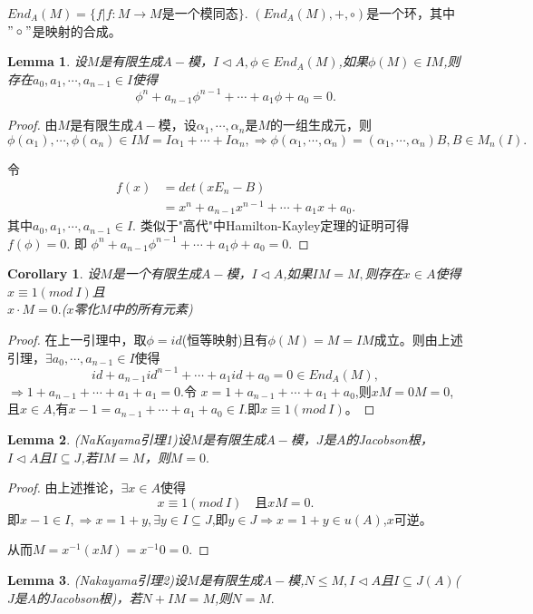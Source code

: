 \documentclass[UTF8]{article}
\newtheorem{cor}{Corollary}[section]
\newtheorem{lem}{Lemma}[section]
\begin{document}
$End_{A}(M)=\{f|f:M\rightarrow M\text{是一个模同态}\}$.
$(End_{A}(M),+,\circ)$是一个环，其中$"\circ"$是映射的合成。
\begin{lem}
	设$M$是有限生成$A-$模，$I\vartriangleleft A,\phi \in End_{A}(M)$,如果$\phi(M)\in IM$,则存在$a_{0},a_{1},\cdots,a_{n-1}\in I$使得$$
	\phi^{n}+a_{n-1}\phi^{n-1}+\cdots+a_{1}\phi+a_{0}=0.
	$$
\end{lem}
\begin{proof}
	由$M$是有限生成$A-$模，设$\alpha_{1},\cdots,\alpha_{n}$是$M$的一组生成元，则$\phi(\alpha_{1}),\cdots,\phi(\alpha_{n})\in IM=I\alpha_{1}+\cdots+I\alpha_{n},\Rightarrow 
	\phi(\alpha_{1},\cdots,\alpha_{n})=(\alpha_{1},\cdots,\alpha_{n})B,B\in M_{n}(I).$
	
	令
	\[
	\begin{split}
	f(x)&=det(xE_{n}-B)\\
	&=x^{n}+a_{n-1}x^{n-1}+\cdots+a_{1}x+a_{0}.
	\end{split}
	\]
	其中$a_{0},a_{1},\cdots,a_{n-1}\in I$.
	类似于"高代"中Hamilton-Kayley定理的证明可得$f(\phi)=0$.
	即
	$\phi^{n}+a_{n-1}\phi^{n-1}+\cdots+a_{1}\phi+a_{0}=0.$
\end{proof}
\begin{cor}
	设$M$是一个有限生成$A-$模，$I\vartriangleleft A$,如果$IM=M,$则存在$x\in A$使得$x\equiv 1(mod\  I)$且\\$x\cdot M=0.$($x$零化$M$中的所有元素)
\end{cor}
\begin{proof}
	在上一引理中，取$\phi=id$(恒等映射)且有$\phi(M)=M=IM$成立。则由上述引理，$\exists a_{0},\cdots,a_{n-1}\in I$使得
	$$
	id+a_{n-1}id^{n-1}+\cdots+a_{1}id+a_{0}=0\in End_{A}(M),
	$$
	$\Rightarrow 1+a_{n-1}+\cdots+a_{1}+a_{1}=0.$令
	$x=1+a_{n-1}+\cdots+a_{1}+a_{0}$,则$xM=0M=0$,且$x\in A$,有$x-1=a_{n-1}+\cdots+a_{1}+a_{0}\in I.$即$x\equiv 1(mod \ I)$。
\end{proof}
\begin{lem}
	(NaKayama引理1)设$M$是有限生成$A-$模，$J$是$A$的Jacobson根，$I\vartriangleleft A$且$I\subseteq J$,若$IM=M$，则$M=0.$
\end{lem}
\begin{proof}
	由上述推论，$\exists x\in A$使得$$
	x\equiv 1(mod \ I)\quad \text{且}xM=0.
	$$
	即$x-1\in I,\Rightarrow x=1+y,\exists y\in I\subseteq J$,即$y\in J\Rightarrow x=1+y\in u(A)$,$x$可逆。
	
	从而$M=x^{-1}(xM)=x^{-1}0=0.$
\end{proof}
\begin{lem}
	(Nakayama引理2)设$M$是有限生成$A-$模,$N\leq M,I\vartriangleleft A$且$I\subseteq J(A)$($J$是$A$的Jacobson根)，若$N+IM=M$,则$N=M.$
\end{lem}
\end{document}
